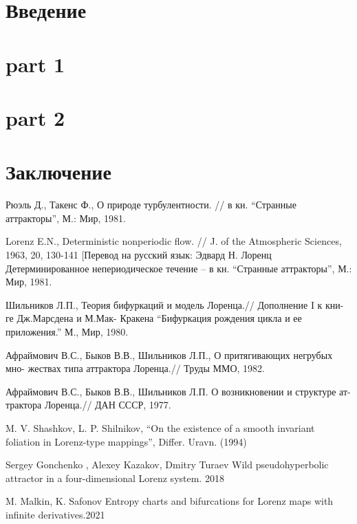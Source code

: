 \documentclass[14pt]{article}
\theoremstyle{definition}
\begin{document}
\pagebreake[2]


\newpage
\tableofcontents
\newpage
\section{Введение}

 
 
 \section{part 1}
 


\newpage
 \section{part 2}
 
 
 




\newpage
\section{Заключение}





\newpage
{}
\begin{thebibliography}{99}

Рюэль Д., Такенс Ф., О природе турбулентности. // в кн. “Странные аттракторы”, М.: Мир, 1981.

 Lorenz E.N., Deterministic nonperiodic flow. // J. of the Atmospheric Sciences, 1963, 20, 130-141 [Перевод на русский язык: Эдвард Н. Лоренц Детерминированное непериодическое течение – в кн. “Странные аттракторы”, М.: Мир, 1981.


 Шильников Л.П., Теория бифуркаций и модель Лоренца.// Дополнение I к кни- ге Дж.Марсдена и М.Мак- Кракена “Бифуркация рождения цикла и ее приложения.” М., Мир, 1980.

 Афраймович В.С., Быков В.В., Шильников Л.П., О притягивающих негрубых мно- жествах типа аттрактора Лоренца.// Труды ММО, 1982.

 Афраймович В.С., Быков В.В., Шильников Л.П. О возникновении и структуре ат- трактора Лоренца.// ДАН СССР, 1977.

 M. V. Shashkov, L. P. Shilnikov, “On the existence of a smooth invariant foliation in Lorenz-type mappings”, Differ. Uravn. (1994)

 Sergey Gonchenko , Alexey Kazakov,  Dmitry Turaev Wild pseudohyperbolic attractor in a four-dimensional Lorenz system. 2018

 M. Malkin, K. Safonov Entropy charts and bifurcations for Lorenz maps with infinite derivatives.2021


\end{thebibliography}
\end{document}
